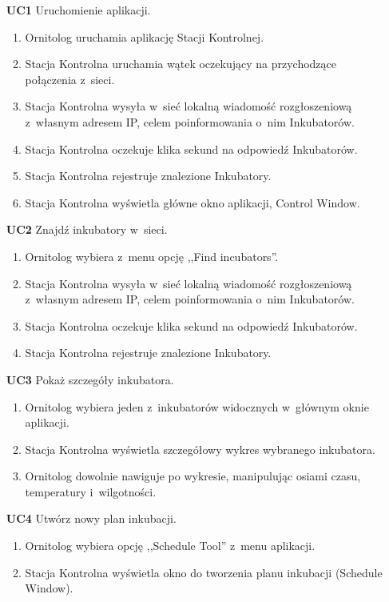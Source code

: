 \begin{itemize}
	\item[\textbf{UC1}] Uruchomienie aplikacji.
		\begin{enumerate}
			\item Ornitolog uruchamia aplikację Stacji Kontrolnej.
			\item Stacja Kontrolna uruchamia wątek oczekujący na przychodzące połączenia z~sieci.
			\item Stacja Kontrolna wysyła w~sieć lokalną wiadomość rozgłoszeniową z~własnym adresem IP, celem poinformowania o~nim Inkubatorów.
			\item Stacja Kontrolna oczekuje klika sekund na odpowiedź Inkubatorów.
			\item Stacja Kontrolna rejestruje znalezione Inkubatory.
			\item Stacja Kontrolna wyświetla główne okno aplikacji, Control Window.
		\end{enumerate}

	\item[\textbf{UC2}] Znajdź inkubatory w~sieci.
		\begin{enumerate}
			\item Ornitolog wybiera z~menu opcję ,,Find incubators''.
			\item Stacja Kontrolna wysyła w~sieć lokalną wiadomość rozgłoszeniową z~własnym adresem IP, celem poinformowania o~nim Inkubatorów.
			\item Stacja Kontrolna oczekuje klika sekund na odpowiedź Inkubatorów.
			\item Stacja Kontrolna rejestruje znalezione Inkubatory.
		\end{enumerate}


	\item[\textbf{UC3}] Pokaż szczegóły inkubatora.
		\begin{enumerate}
			\item Ornitolog wybiera jeden z~inkubatorów widocznych w~głównym oknie aplikacji.
			\item Stacja Kontrolna wyświetla szczegółowy wykres wybranego inkubatora.
			\item Ornitolog dowolnie nawiguje po wykresie, manipulując osiami czasu, temperatury i~wilgotności.
		\end{enumerate}

	\item[\textbf{UC4}] Utwórz nowy plan inkubacji.
		\begin{enumerate}
			\item Ornitolog wybiera opcję ,,Schedule Tool'' z~menu aplikacji.
			\item Stacja Kontrolna wyświetla okno do tworzenia planu inkubacji (Schedule Window).
		\end{enumerate}


\end{itemize}
